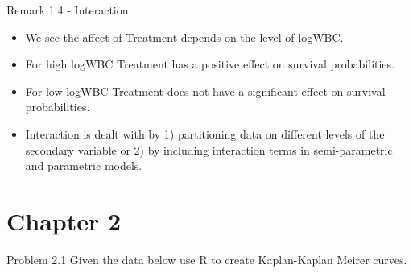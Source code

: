 \documentclass{beamer}
\theoremstyle{definition}
\begin{document}
 
\begin{frame}
\begin{block}{Remark 1.4 - Interaction}
\begin{itemize}
\item We see the affect of Treatment depends on the level of logWBC. 
\item For high logWBC Treatment has a positive effect on survival probabilities. 
\item For low logWBC Treatment does not have a significant effect on survival probabilities. 
\item Interaction is dealt with by 1) partitioning data on different levels of the secondary variable or 2) by including interaction terms in semi-parametric and parametric models. 
\end{itemize}
\end{block}
\end{frame}



\section{Chapter 2}
\begin{frame}
\begin{block}{Problem 2.1}
Given the data below use R to create Kaplan-Kaplan Meirer curves.
\end{block}
\end{frame}
\end{document}
